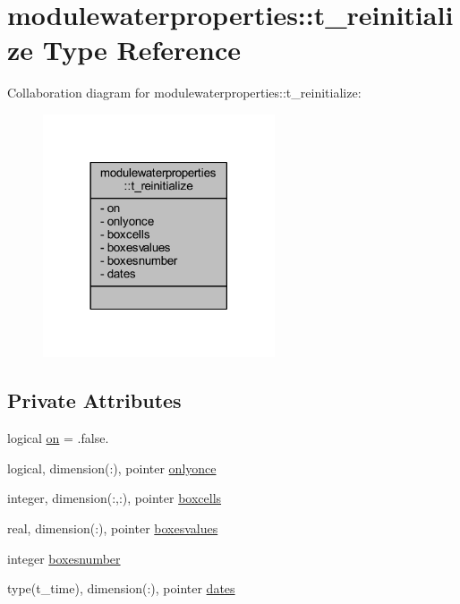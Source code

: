 \hypertarget{structmodulewaterproperties_1_1t__reinitialize}{}\section{modulewaterproperties\+:\+:t\+\_\+reinitialize Type Reference}
\label{structmodulewaterproperties_1_1t__reinitialize}


Collaboration diagram for modulewaterproperties\+:\+:t\+\_\+reinitialize\+:\nopagebreak
\begin{figure}[H]
\begin{center}
\leavevmode
\includegraphics[width=194pt]{structmodulewaterproperties_1_1t__reinitialize__coll__graph}
\end{center}
\end{figure}
\subsection*{Private Attributes}
\begin{DoxyCompactItemize}
\item 
logical \mbox{\hyperlink{structmodulewaterproperties_1_1t__reinitialize_a54ce0b8159b887be5cd68e4b6911e3dd}{on}} = .false.
\item 
logical, dimension(\+:), pointer \mbox{\hyperlink{structmodulewaterproperties_1_1t__reinitialize_ae2eb5b4f64f6e34275664921f24ca08d}{onlyonce}}
\item 
integer, dimension(\+:,\+:), pointer \mbox{\hyperlink{structmodulewaterproperties_1_1t__reinitialize_ad55f8b2b26b9debea07c8f7a47d035d3}{boxcells}}
\item 
real, dimension(\+:), pointer \mbox{\hyperlink{structmodulewaterproperties_1_1t__reinitialize_a118020904541fc4001a2d07cfdd3a1a7}{boxesvalues}}
\item 
integer \mbox{\hyperlink{structmodulewaterproperties_1_1t__reinitialize_a3287ae89dfae24ac193ed55acb765bf6}{boxesnumber}}
\item 
type(t\+\_\+time), dimension(\+:), pointer \mbox{\hyperlink{structmodulewaterproperties_1_1t__reinitialize_ac9b0f13881b07c5240f43e1773771523}{dates}}
\end{DoxyCompactItemize}


